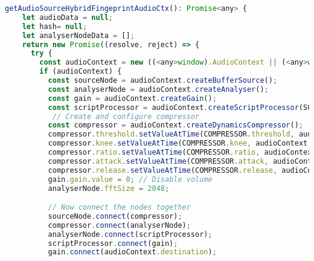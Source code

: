 \begin{lstlisting}[language=JavaScript, caption=Audio Source Hybrid fingerprint generation code, label=audioSourceHybridFingerprintGenerationCode]
  getAudioSourceHybridFingeprintAudioCtx(): Promise<any> {
    let audioData = null;
    let hash= null;
    let analyserNodeData = [];
    return new Promise((resolve, reject) => {
      try {
        const audioContext = new ((<any>window).AudioContext || (<any>window).webkitAudioContext)();
        if (audioContext) {
          const sourceNode = audioContext.createBufferSource();
          const analyserNode = audioContext.createAnalyser();
          const gain = audioContext.createGain();
          const scriptProcessor = audioContext.createScriptProcessor(SCRIPT_PROCESSOR.bufferSize, SCRIPT_PROCESSOR.numberOfInputChannels, SCRIPT_PROCESSOR.numberOfOutputChannels);
           // Create and configure compressor
          const compressor = audioContext.createDynamicsCompressor();
          compressor.threshold.setValueAtTime(COMPRESSOR.threshold, audioContext.currentTime);
          compressor.knee.setValueAtTime(COMPRESSOR.knee, audioContext.currentTime);
          compressor.ratio.setValueAtTime(COMPRESSOR.ratio, audioContext.currentTime);
          compressor.attack.setValueAtTime(COMPRESSOR.attack, audioContext.currentTime);
          compressor.release.setValueAtTime(COMPRESSOR.release, audioContext.currentTime);
          gain.gain.value = 0; // Disable volume
          analyserNode.fftSize = 2048;

          // Now connect the nodes together
          sourceNode.connect(compressor);
          compressor.connect(analyserNode);
          analyserNode.connect(scriptProcessor);
          scriptProcessor.connect(gain);
          gain.connect(audioContext.destination);


\end{lstlisting}
